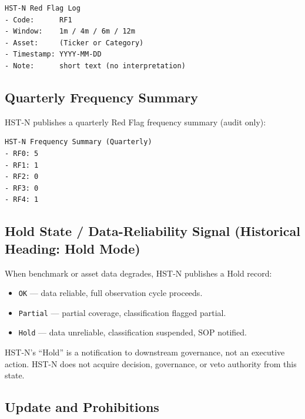 \begin{lstlisting}[basicstyle=\ttfamily\small,frame=single]
HST-N Red Flag Log
- Code:      RF1
- Window:    1m / 4m / 6m / 12m
- Asset:     (Ticker or Category)
- Timestamp: YYYY-MM-DD
- Note:      short text (no interpretation)
\end{lstlisting}

\subsection{Quarterly Frequency Summary}
\label{sec:hstn-frequency-summary-c2}

HST-N publishes a quarterly Red Flag frequency summary (audit only):

\begin{lstlisting}[basicstyle=\ttfamily\small,frame=single]
HST-N Frequency Summary (Quarterly)
- RF0: 5
- RF1: 1
- RF2: 0
- RF3: 0
- RF4: 1
\end{lstlisting}

\subsection{Hold State / Data-Reliability Signal
(Historical Heading: Hold Mode)}
\label{sec:hstn-hold-c2}


When benchmark or asset data degrades, HST-N publishes a Hold
record:

\begin{itemize}
\item \texttt{OK} --- data reliable, full observation cycle
proceeds.
\item \texttt{Partial} --- partial coverage, classification flagged
partial.
\item \texttt{Hold} --- data unreliable, classification suspended,
SOP notified.
\end{itemize}

HST-N's ``Hold'' is a notification to downstream governance, not an
executive action. HST-N does not acquire decision, governance, or veto
authority from this state.

\subsection{Update and Prohibitions}
\label{sec:hstn-update-prohibitions-c2}

